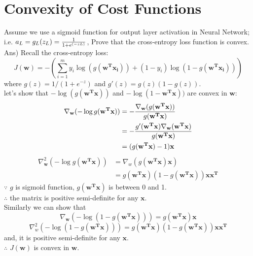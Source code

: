 \documentclass[12pt]{article}%
\begin{document}
\section{Convexity of Cost Functions}
Assume we use a sigmoid function for output layer activation in Neural Network; i.e. $a_L = g_L (z_L ) = {1 \over {1 + e^{(-zL)}}}$, Prove that the cross-entropy loss function is convex.\\
Ans) Recall the cross-entropy loss:
\begin{equation}
	J(\mathbf{w}) = - (\sum_{i=1}^{m} y_i \log(g(\mathbf{w^T x_i})) + (1 - y_i )\log (1 - g(\mathbf{w^T x_i})))
\end{equation}
where $g(z) = 1/(1+e^{-z})$ and $g'(z) = g(z) (1 - g(z))$.\\
let's show that $- \log(g(\mathbf{w^T x}))$ and $- \log(1 - \mathbf{w^T x}))$ are convex in $\mathbf{w}$:\\
\begin{equation}
	\begin{aligned}
		\nabla_\mathbf{w} (- \log g(\mathbf{w^T x})) &= - {{\nabla_\mathbf{w} (g(\mathbf{w^T x}))} \over {g(\mathbf{w^T x})}}\\
		&= - { {g'(\mathbf{w^T x}) \nabla_\mathbf{w} (\mathbf{w^T x})} \over {g(\mathbf{w^T x})}} \\
		&= (g(\mathbf{w^T x}) - 1) \mathbf{x}\\
	\end{aligned}
\end{equation}
\begin{equation}
	\begin{aligned}
		\nabla^2_\mathbf{w} (- \log g(\mathbf{w^T x}))&= \nabla_w (g(\mathbf{w^T x}) \mathbf{x})\\
		&=g(\mathbf{w^T x})(1 - g(\mathbf{w^T x}))\mathbf{x x^T}
	\end{aligned}
\end{equation}
$\because$ $g$ is sigmoid function, $g(\mathbf{w^T x})$ is between 0 and 1.\\
$\therefore$ the matrix is positive semi-definite for any $\mathbf{x}$.\\
Similarly we can show that
\begin{equation}
	\nabla_\mathbf{w} (- \log (1 - g(\mathbf{w^T x}))) = g(\mathbf{w^T x})\mathbf{x} 
\end{equation}
\begin{equation}
	\nabla_w^2(- \log (1 - g(\mathbf{w^T x}))) = g(\mathbf{w^T x})(1 - g(\mathbf{w^T x}))\mathbf{x x^T}
\end{equation}
and, it is positive semi-definite for any $\mathbf{x}$.\\
$\therefore$ $J(\mathbf{w})$ is convex in $\mathbf{w}$.
\end{document}
